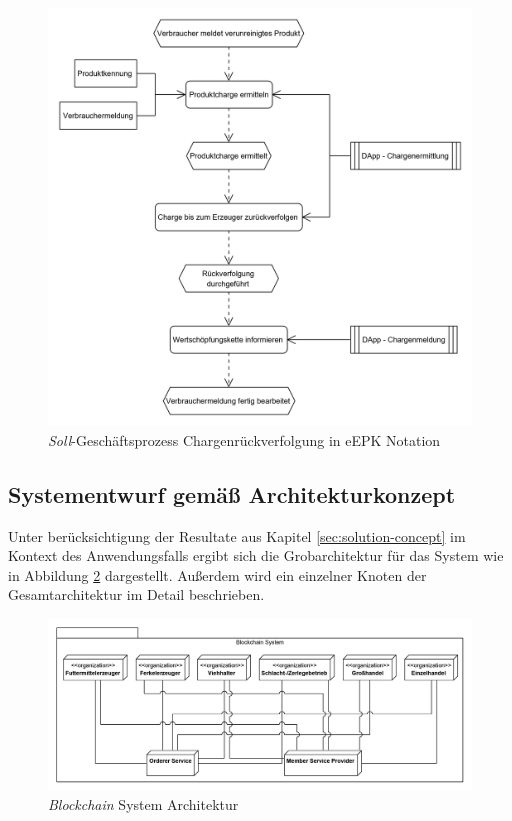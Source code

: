 \begin{figure}[H]
	\centering
	\includegraphics[width=0.92\linewidth]{pictures/business-process-target-epc-diagram-bw}
	\caption[\textit{Soll}-Geschäftsprozess Chargenrückverfolgung]{\textit{Soll}-Geschäftsprozess Chargenrückverfolgung in eEPK Notation}
	\label{fig:target-business-process}
\end{figure}

\subsection{Systementwurf gemäß Architekturkonzept}\label{system-design-concept}
Unter berücksichtigung der Resultate aus Kapitel \ref{sec:solution-concept} im Kontext des Anwendungsfalls ergibt sich die Grobarchitektur für das System wie in Abbildung \ref{fig:blockchain-system-architecture} dargestellt. Außerdem wird ein einzelner Knoten der Gesamtarchitektur im Detail beschrieben.

\begin{figure}[H]
	\centering
	\includegraphics[width=1\linewidth]{pictures/blockchain-system-deployment-diagram}
	\caption[\textit{Blockchain} System Architektur]{\textit{Blockchain} System Architektur}
	\label{fig:blockchain-system-architecture}
\end{figure}

